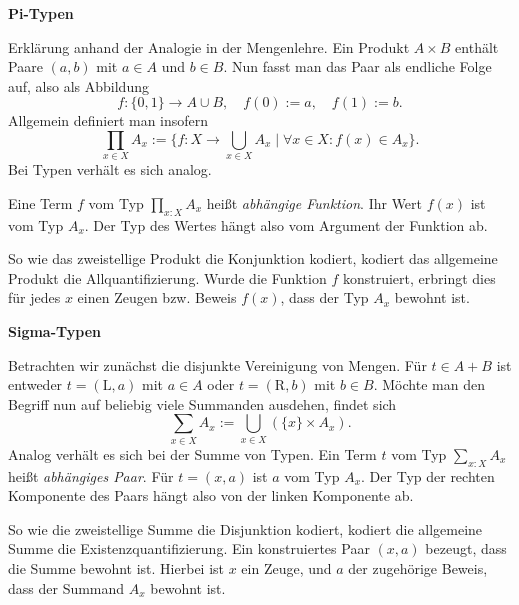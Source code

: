\documentclass[8pt]{beamer}
\newcommand{\strong}[1]{\textsf{\textbf{#1}}}
\newcommand{\parspace}{\vspace{0.8em}}
\begin{document}
\begin{frame}[t]
\strong{Pi-Typen}

\vspace{3em}
Erklärung anhand der Analogie in der Mengenlehre. Ein Produkt $A\times B$
enthält Paare $(a,b)$ mit $a\in A$ und $b\in B$. Nun fasst man das
Paar als endliche Folge auf, also als Abbildung
\[f\colon\{0,1\}\to A\cup B, \quad f(0):=a,\quad f(1):=b.\]\pause
Allgemein definiert man insofern
\[\prod_{x\in X} A_x := \{f\colon X\to\bigcup_{x\in X}A_x\mid\forall x\in X\colon f(x)\in A_x\}.\]\pause
Bei Typen verhält es sich analog.

\parspace
Eine Term $f$ vom Typ $\prod_{x\colon X} A_x$ heißt \emph{abhängige Funktion}.
Ihr Wert $f(x)$ ist vom Typ $A_x$. Der Typ des Wertes hängt also vom Argument
der Funktion ab.\pause

\parspace
So wie das zweistellige Produkt die Konjunktion kodiert, kodiert
das allgemeine Produkt die Allquantifizierung. Wurde die Funktion $f$
konstruiert, erbringt dies für jedes $x$ einen Zeugen bzw. Beweis $f(x)$,
dass der Typ $A_x$ bewohnt ist.
\end{frame}

\begin{frame}[t]
\strong{Sigma-Typen}

\vspace{3em}
Betrachten wir zunächst die disjunkte Vereinigung von Mengen.
Für $t\in A+B$ ist entweder $t=(\mathrm L,a)$ mit $a\in A$ oder
$t=(\mathrm R,b)$ mit $b\in B$. Möchte man den Begriff nun auf
beliebig viele Summanden ausdehen, findet sich
\[\sum_{x\in X} A_x := \bigcup_{x\in X} (\{x\}\times A_x).\]\pause
Analog verhält es sich bei der Summe von Typen. Ein Term $t$ vom
Typ $\sum_{x\colon X} A_x$ heißt \emph{abhängiges Paar}.
Für $t=(x,a)$ ist $a$ vom Typ $A_x$. Der Typ der rechten Komponente
des Paars hängt also von der linken Komponente ab.\pause

\parspace
So wie die zweistellige Summe die Disjunktion kodiert, kodiert
die allgemeine Summe die Existenzquantifizierung. Ein konstruiertes
Paar $(x,a)$ bezeugt, dass die Summe bewohnt ist. Hierbei ist
$x$ ein Zeuge, und $a$ der zugehörige Beweis, dass der Summand
$A_x$ bewohnt ist.
\end{frame}
\end{document}
